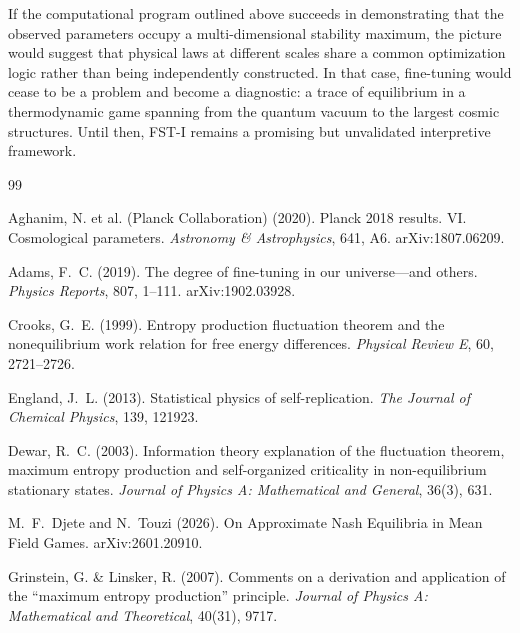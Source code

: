 \documentclass[12pt,a4paper]{article}
\theoremstyle{remark}
\begin{document}
If the computational program outlined above succeeds in demonstrating that the observed parameters occupy a multi-dimensional stability maximum, the picture would suggest that physical laws at different scales share a common optimization logic rather than being independently constructed. In that case, fine-tuning would cease to be a problem and become a diagnostic: a trace of equilibrium in a thermodynamic game spanning from the quantum vacuum to the largest cosmic structures. Until then, FST-I remains a promising but unvalidated interpretive framework.



\begin{thebibliography}{99}

Aghanim, N. et al. (Planck Collaboration) (2020).
\newblock Planck 2018 results. VI. Cosmological parameters.
\newblock \textit{Astronomy \& Astrophysics}, 641, A6.
\newblock arXiv:1807.06209.

Adams, F.~C. (2019).
\newblock The degree of fine-tuning in our universe---and others.
\newblock \textit{Physics Reports}, 807, 1--111.
\newblock arXiv:1902.03928.

Crooks, G.~E. (1999).
\newblock Entropy production fluctuation theorem and the nonequilibrium work relation for free energy differences.
\newblock \textit{Physical Review E}, 60, 2721--2726.

England, J.~L. (2013).
\newblock Statistical physics of self-replication.
\newblock \textit{The Journal of Chemical Physics}, 139, 121923.

Dewar, R.~C. (2003).
\newblock Information theory explanation of the fluctuation theorem, maximum entropy production and self-organized criticality in non-equilibrium stationary states.
\newblock \textit{Journal of Physics A: Mathematical and General}, 36(3), 631.

M.~F.~Djete and N.~Touzi (2026).
\newblock On Approximate Nash Equilibria in Mean Field Games.
\newblock arXiv:2601.20910.

Grinstein, G. \& Linsker, R. (2007).
\newblock Comments on a derivation and application of the ``maximum entropy production'' principle.
\newblock \textit{Journal of Physics A: Mathematical and Theoretical}, 40(31), 9717.


\end{thebibliography}
\end{document}
